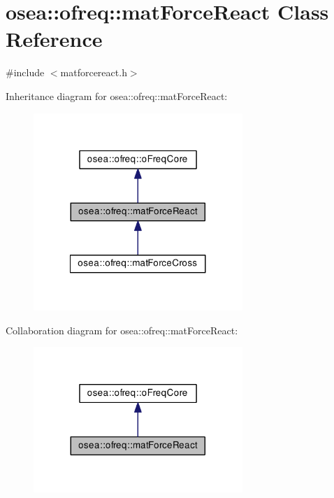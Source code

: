 \hypertarget{classosea_1_1ofreq_1_1mat_force_react}{\section{osea\-:\-:ofreq\-:\-:mat\-Force\-React Class Reference}
\label{classosea_1_1ofreq_1_1mat_force_react}
}


{\ttfamily \#include $<$matforcereact.\-h$>$}



Inheritance diagram for osea\-:\-:ofreq\-:\-:mat\-Force\-React\-:\nopagebreak
\begin{figure}[H]
\begin{center}
\leavevmode
\includegraphics[width=224pt]{classosea_1_1ofreq_1_1mat_force_react__inherit__graph}
\end{center}
\end{figure}


Collaboration diagram for osea\-:\-:ofreq\-:\-:mat\-Force\-React\-:\nopagebreak
\begin{figure}[H]
\begin{center}
\leavevmode
\includegraphics[width=224pt]{classosea_1_1ofreq_1_1mat_force_react__coll__graph}
\end{center}
\end{figure}
